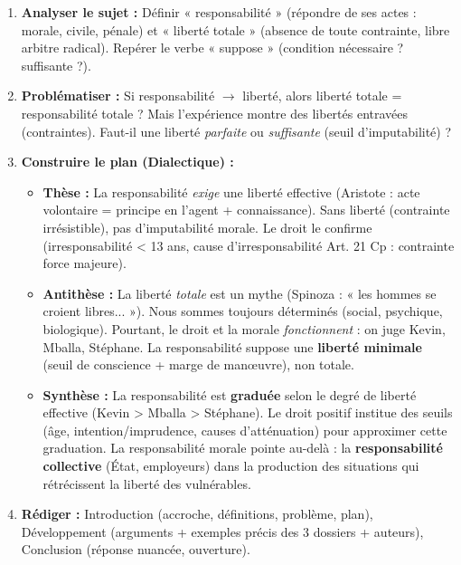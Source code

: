 \documentclass[11pt]{article}
\begin{document}
\begin{methode}
\begin{enumerate}
    \item \textbf{Analyser le sujet :} Définir « responsabilité » (répondre de ses actes : morale, civile, pénale) et « liberté totale » (absence de toute contrainte, libre arbitre radical). Repérer le verbe « suppose » (condition nécessaire ? suffisante ?).
    \item \textbf{Problématiser :} Si responsabilité $\rightarrow$ liberté, alors liberté totale = responsabilité totale ? Mais l'expérience montre des libertés entravées (contraintes). Faut-il une liberté \textit{parfaite} ou \textit{suffisante} (seuil d'imputabilité) ?
    \item \textbf{Construire le plan (Dialectique) :}
    \begin{itemize}
        \item \textbf{Thèse :} La responsabilité \textit{exige} une liberté effective (Aristote : acte volontaire = principe en l'agent + connaissance). Sans liberté (contrainte irrésistible), pas d'imputabilité morale. Le droit le confirme (irresponsabilité < 13 ans, cause d'irresponsabilité Art. 21 Cp : contrainte force majeure).
        \item \textbf{Antithèse :} La liberté \textit{totale} est un mythe (Spinoza : « les hommes se croient libres... »). Nous sommes toujours déterminés (social, psychique, biologique). Pourtant, le droit et la morale \textit{fonctionnent} : on juge Kevin, Mballa, Stéphane. La responsabilité suppose une \textbf{liberté minimale} (seuil de conscience + marge de manœuvre), non totale.
        \item \textbf{Synthèse :} La responsabilité est \textbf{graduée} selon le degré de liberté effective (Kevin > Mballa > Stéphane). Le droit positif institue des seuils (âge, intention/imprudence, causes d'atténuation) pour approximer cette graduation. La responsabilité morale pointe au-delà : la \textbf{responsabilité collective} (État, employeurs) dans la production des situations qui rétrécissent la liberté des vulnérables.
    \end{itemize}
    \item \textbf{Rédiger :} Introduction (accroche, définitions, problème, plan), Développement (arguments + exemples précis des 3 dossiers + auteurs), Conclusion (réponse nuancée, ouverture).
\end{enumerate}
\end{methode}
\end{document}
